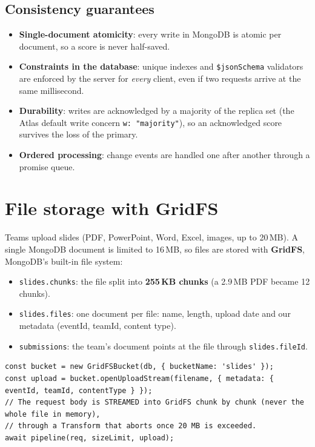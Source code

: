 \documentclass[11pt,a4paper]{article}
\newcommand{\op}[1]{\texttt{\$#1}}
\newcommand{\coll}[1]{\texttt{#1}}
\begin{document}
\subsection{Consistency guarantees}
\begin{itemize}[leftmargin=1.4em]
  \item \textbf{Single-document atomicity}: every write in MongoDB is atomic per document, so a score is never
        half-saved.
  \item \textbf{Constraints in the database}: unique indexes and \op{jsonSchema} validators are enforced by the
        server for \emph{every} client, even if two requests arrive at the same millisecond.
  \item \textbf{Durability}: writes are acknowledged by a majority of the replica set (the Atlas default write concern
        \texttt{w: "majority"}), so an acknowledged score survives the loss of the primary.
  \item \textbf{Ordered processing}: change events are handled one after another through a promise queue.
\end{itemize}

\section{File storage with GridFS}
Teams upload slides (PDF, PowerPoint, Word, Excel, images, up to 20\,MB). A single MongoDB document is limited to
16\,MB, so files are stored with \textbf{GridFS}, MongoDB's built-in file system:

\begin{itemize}[leftmargin=1.4em]
  \item \coll{slides.chunks}: the file split into \textbf{255\,KB chunks} (a 2.9\,MB PDF became 12 chunks).
  \item \coll{slides.files}: one document per file: name, length, upload date and our metadata (eventId, teamId,
        content type).
  \item \coll{submissions}: the team's document points at the file through \texttt{slides.fileId}.
\end{itemize}

\begin{lstlisting}
const bucket = new GridFSBucket(db, { bucketName: 'slides' });
const upload = bucket.openUploadStream(filename, { metadata: { eventId, teamId, contentType } });
// The request body is STREAMED into GridFS chunk by chunk (never the whole file in memory),
// through a Transform that aborts once 20 MB is exceeded.
await pipeline(req, sizeLimit, upload);
\end{lstlisting}
\end{document}
